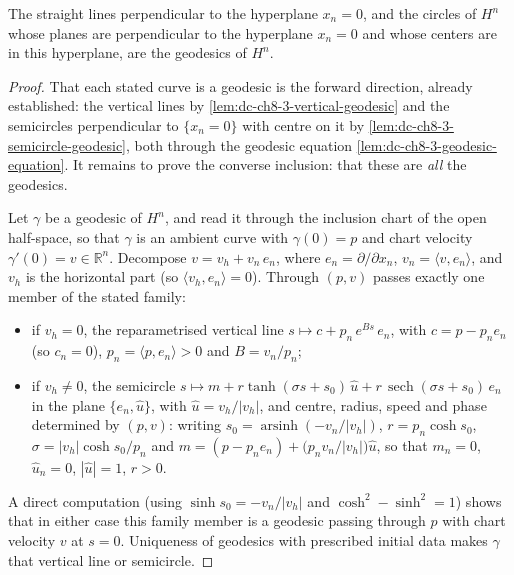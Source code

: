 \begin{proposition}[geodesics of $H^n$]
  \label{prop:dc-ch8-3-1}
  \leanok
  The straight lines perpendicular to the hyperplane $x_n=0$, and the circles of
  $H^n$ whose planes are perpendicular to the hyperplane $x_n=0$ and whose centers
  are in this hyperplane, are the geodesics of $H^n$.
\end{proposition}
\begin{proof}
  \leanok
\sketch
  That each stated curve is a geodesic is the forward direction, already established:
  the vertical lines by \cref{lem:dc-ch8-3-vertical-geodesic} and the semicircles
  perpendicular to $\{x_n=0\}$ with centre on it by
  \cref{lem:dc-ch8-3-semicircle-geodesic}, both through the geodesic equation
  \cref{lem:dc-ch8-3-geodesic-equation}. It remains to prove the converse inclusion:
  that these are \emph{all} the geodesics.

  Let $\gamma$ be a geodesic of $H^n$, and read it through the inclusion chart of the
  open half-space, so that $\gamma$ is an ambient curve with $\gamma(0)=p$ and chart
  velocity $\gamma'(0)=v\in\mathbb R^n$. Decompose $v=v_h+v_n\,e_n$, where
  $e_n=\partial/\partial x_n$, $v_n=\langle v,e_n\rangle$, and $v_h$ is the horizontal
  part (so $\langle v_h,e_n\rangle=0$). Through $(p,v)$ passes exactly one member of
  the stated family:
  \begin{itemize}
    \item if $v_h=0$, the reparametrised vertical line
      $s\mapsto c+p_n\,e^{Bs}\,e_n$, with $c=p-p_n e_n$ (so $c_n=0$), $p_n=\langle
      p,e_n\rangle>0$ and $B=v_n/p_n$;
    \item if $v_h\neq0$, the semicircle
      $s\mapsto m+r\tanh(\sigma s+s_0)\,\hat u+r\,\operatorname{sech}(\sigma s+s_0)\,e_n$
      in the plane $\{e_n,\hat u\}$, with $\hat u=v_h/|v_h|$, and centre, radius,
      speed and phase determined by $(p,v)$: writing $s_0=\operatorname{arsinh}(-v_n/|v_h|)$,
      $r=p_n\cosh s_0$, $\sigma=|v_h|\cosh s_0/p_n$ and
      $m=(p-p_n e_n)+\bigl(p_n v_n/|v_h|\bigr)\hat u$, so that $m_n=0$, $\hat u_n=0$,
      $|\hat u|=1$, $r>0$.
  \end{itemize}
  A direct computation (using $\sinh s_0=-v_n/|v_h|$ and
  $\cosh^2-\sinh^2=1$) shows that in either case this family member is a geodesic
  passing through $p$ with chart velocity $v$ at $s=0$. Uniqueness of geodesics with
  prescribed initial data makes $\gamma$ that vertical line or semicircle.
\end{proof}

